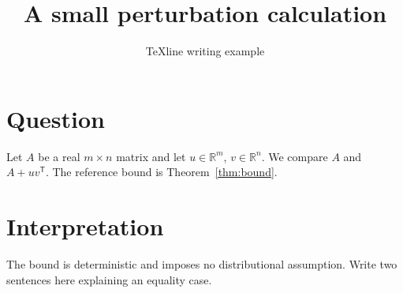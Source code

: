 \documentclass{article}
\title{A small perturbation calculation}
\author{TeXline writing example}
\date{}
\begin{document}
\maketitle
\section{Question}
Let $A$ be a real $m\times n$ matrix and let $u\in\mathbb R^m$,
$v\in\mathbb R^n$. We compare $A$ and $A+uv^{\mathsf T}$.
The reference bound is Theorem~\ref{thm:bound}.

\section{Interpretation}
The bound is deterministic and imposes no distributional assumption.
Write two sentences here explaining an equality case.
\end{document}
